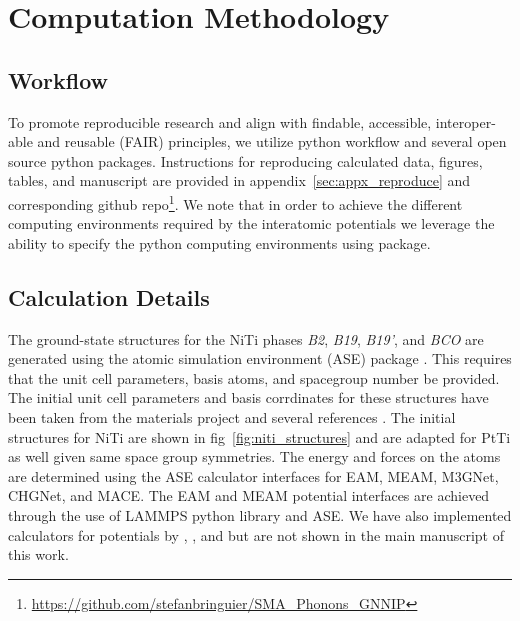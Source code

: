 \documentclass[preprint,colorlinks=true,linkcolor=black,citecolor=black]{elsarticle}
\begin{document}
\section{Computation Methodology}
\label{sec:methods}

\subsection{Workflow}
\label{sec:workflow}
To promote reproducible research and align with findable, accessible,
interoper-able and reusable (FAIR) principles\cite{Walsh2024}, we
utilize \showyourwork python workflow\cite{Luger2021} and several open
source python packages. Instructions for reproducing calculated data,
figures, tables, and manuscript are provided in
appendix~\ref{sec:appx_reproduce} and corresponding github
repo\footnote{\url{https://github.com/stefanbringuier/SMA_Phonons_GNNIP}}. We
note that in order to achieve the different computing environments
required by the interatomic potentials we leverage the ability to specify the
python computing environments using \href{https://github.com/showyourwork/showyourwork}{\showyourwork}
package.\par

\subsection{Calculation Details}
\label{sec:calc_details}
The ground-state structures for the NiTi phases \textit{B2},
\textit{B19}, \textit{B19'}, and \textit{BCO} are generated using the
atomic simulation environment (ASE) package \cite{Larsen2017}. This
requires that the unit cell parameters, basis atoms, and spacegroup
number be provided. The initial unit cell parameters and basis
corrdinates for these structures have been taken from the materials
project \cite{Jain2013} and several references
\cite{Haskins2016,Kadkhodaei2018}. The initial structures for NiTi are
shown in fig~\ref{fig:niti_structures} and are adapted for PtTi as
well given same space group symmetries. The energy and forces on the
atoms are determined using the ASE calculator interfaces for EAM,
MEAM, M3GNet, CHGNet, and MACE.\cite{Mutter2010,Zhong2011,Ko2015,Kim2017,Chen2022,Deng2023,Batatia2022}
The EAM and MEAM potential interfaces are achieved through the use of
LAMMPS python library \cite{Thompson2022} and ASE. We have also implemented calculators for potentials by \cite{Kavousi2019}, \cite{Wang2018}, and \cite{Choudhary2021} but are not shown in the main manuscript of this work.\par
\end{document}
